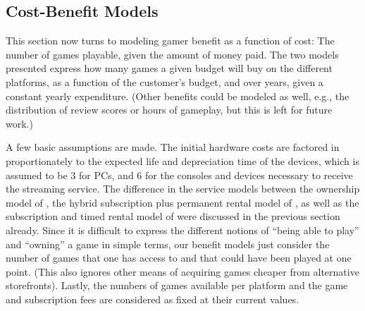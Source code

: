 %




\subsection{Cost-Benefit Models}\label{subsec:cost-benefit-models}

This section now turns to modeling gamer benefit as a function of cost: The number of games playable, given the amount of money paid. The two models presented express how many games a given budget will buy on the different platforms, as a function of the customer's budget, and over years, given a constant yearly expenditure. (Other benefits could be modeled as well, e.g., the distribution of review scores or hours of gameplay, but this is left for future work.)

A few basic assumptions are made. The initial hardware costs are factored in proportionately to the expected life and depreciation time of the devices, which is assumed to be \SI{3}{\year} for PCs, and \SI{6}{\year} for the consoles and devices necessary to receive the streaming service. %
The difference in the service models between the ownership model of \steam, the hybrid subscription plus permanent rental model of \gfnow, as well as the subscription and timed rental model of \psnow were discussed in the previous section already. Since it is difficult to express the different notions of ``being able to play'' and ``owning'' a game in simple terms, our benefit models just consider the number of games that one has access to and that could have been played at one point. (This also ignores other means of acquiring games cheaper from alternative storefronts).
Lastly, the numbers of games available per platform and the game and subscription fees are considered as fixed at their current values.


